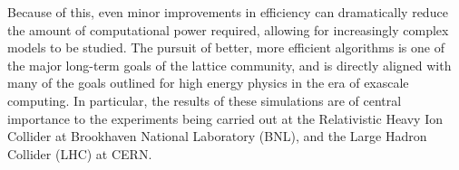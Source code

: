 \documentclass[../main.tex]{subfiles}
\begin{document}
%
%
Because of this, even minor improvements in efficiency can dramatically reduce the amount of computational power
required, allowing for increasingly complex models to be studied.
%
The pursuit of better, more efficient algorithms is one of the major long-term goals of the lattice community, and is
directly aligned with many of the goals outlined for high energy physics in the era of exascale computing. 
%
In particular, the results of these simulations are of central importance to the experiments being carried out at the
Relativistic Heavy Ion Collider at Brookhaven National Laboratory (BNL), and the Large Hadron Collider (LHC) at CERN.

%



%
%




%
%
%
%


%
\end{document}
